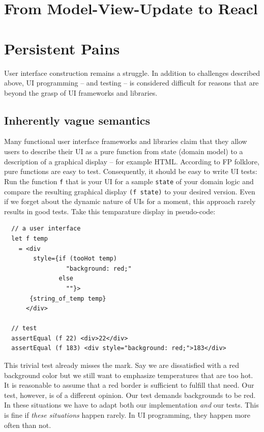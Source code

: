 \documentclass[sigplan,screen]{acmart}
\begin{document}
\section{From Model-View-Update to Reacl}


\section{Persistent Pains}

User interface construction remains a struggle. In addition to
challenges described above, UI programming -- and testing -- is
considered difficult for reasons that are beyond the grasp of UI
frameworks and libraries.

\subsection{Inherently vague semantics}

Many functional user interface frameworks and libraries claim that
they allow users to describe their UI as a pure function from state
(domain model) to a description of a graphical display -- for example
HTML. According to FP folklore, pure functions are easy to
test. Consequently, it should be easy to write UI tests: Run the
function \texttt{f} that is your UI for a sample \texttt{state} of
your domain logic and compare the resulting graphical display
\texttt{(f state)} to your desired version. Even if we forget about
the dynamic nature of UIs for a moment, this approach rarely results
in good tests. Take this temparature display in pseudo-code:
%
\begin{verbatim}
  // a user interface
  let f temp
    = <div
        style={if (tooHot temp)
                 "background: red;"
               else
                 ""}>
       {string_of_temp temp}
      </div>

  // test
  assertEqual (f 22) <div>22</div>
  assertEqual (f 183) <div style="background: red;">183</div>
\end{verbatim}
%
This trivial test already misses the mark. Say we are dissatisfied
with a red background color but we still want to emphasize
temperatures that are too hot. It is reasonable to assume that a red
border is sufficient to fulfill that need. Our test, however, is of a
different opinion. Our test demands backgrounds to be red. In these
situations we have to adapt both our implementation \textit{and} our
tests. This is fine if \textit{these situations} happen rarely. In UI
programming, they happen more often than not.
\end{document}
